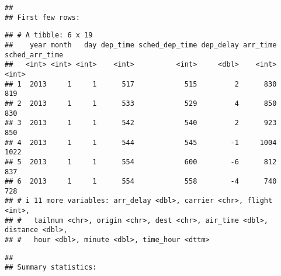 \documentclass[
]{article}
\begin{document}
\begin{verbatim}
## 
## First few rows:
\end{verbatim}

\begin{verbatim}
## # A tibble: 6 x 19
##    year month   day dep_time sched_dep_time dep_delay arr_time sched_arr_time
##   <int> <int> <int>    <int>          <int>     <dbl>    <int>          <int>
## 1  2013     1     1      517            515         2      830            819
## 2  2013     1     1      533            529         4      850            830
## 3  2013     1     1      542            540         2      923            850
## 4  2013     1     1      544            545        -1     1004           1022
## 5  2013     1     1      554            600        -6      812            837
## 6  2013     1     1      554            558        -4      740            728
## # i 11 more variables: arr_delay <dbl>, carrier <chr>, flight <int>,
## #   tailnum <chr>, origin <chr>, dest <chr>, air_time <dbl>, distance <dbl>,
## #   hour <dbl>, minute <dbl>, time_hour <dttm>
\end{verbatim}

\begin{verbatim}
## 
## Summary statistics:
\end{verbatim}
\end{document}
